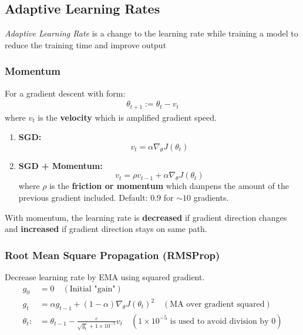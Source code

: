 \documentclass[11pt,a4paper]{article}
\begin{document}
\subsection{Adaptive Learning Rates}
\textit{Adaptive Learning Rate} is a change to the learning rate while training a model to reduce the training time and improve output
\subsubsection{Momentum}
For a gradient descent with form:
\begin{equation}
    \begin{aligned}
        \theta_{t+1}:=\theta_t-v_t
    \end{aligned}
    \nonumber
\end{equation}
where $v_t$ is the \textbf{velocity} which is amplified gradient speed.
\begin{enumerate}
    \item \textbf{SGD:} $$v_t=\alpha \nabla_\theta J(\theta_t)$$
    \item \textbf{SGD + Momentum:} $$v_t=\rho v_{t-1}+\alpha \nabla_\theta J(\theta_t)$$
    where $\rho$ is the \textbf{friction or momentum} which dampens the amount of the previous gradient included. Default: $0.9$ for $\sim 10$ gradients.
\end{enumerate}
With momentum, the learning rate is \textbf{decreased} if gradient direction changes and \textbf{increased} if gradient direction stays on same path.

\subsubsection{Root Mean Square Propagation (RMSProp)}
Decrease learning rate by EMA using squared gradient.
\begin{equation}
    \begin{aligned}
        g_0&=0\quad (\text{Initial "gain"})\\
        g_t&=\alpha g_{t-1}+(1-\alpha) \nabla_\theta J(\theta_t)^2\quad (\text{MA over gradient squared})\\
        \theta_t:&=\theta_{t-1}-\frac{\varepsilon}{\sqrt{g_t}+1\times 10^{-5}}v_t\quad (1\times 10^{-5} \text{ is used to avoid division by $0$})\\
    \end{aligned}
    \nonumber
\end{equation}
\end{document}
